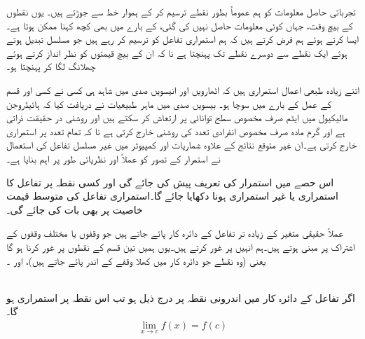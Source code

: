 تجرباتی حاصل معلومات  کو ہم عموماً بطور نقطے ترسیم کر کے  ہموار خط سے جوڑتے ہیں۔ یوں نقطوں کے بیچ وقت، جہاں کوئی معلومات حاصل نہیں کی گئی، کے بارے میں بھی کچھ کہنا ممکن ہوتا ہے۔ایسا کرتے ہوئے ہم فرض کرتے ہیں کہ ہم استمراری تفاعل کو ترسیم کر رہے ہیں جو مسلسل تبدیل ہوتے ہوئے ایک نقطے سے دوسرے نقطے تک پہنچتا ہے نا کہ ان کے بیچ قیمتوں کو نظر انداز کرتے ہوئے چھلانگ لگا کر پہنچتا ہو۔   

اتنے زیادہ طبعی اعمال  استمراری ہیں کہ اٹھارویں اور  انیسویں  صدی میں شاہد ہی کسی نے کسی اور قسم کے عمل کے بارے میں سوچا ہو۔ بیسویں صدی میں ماہر طبیعیات نے دریافت کیا کہ ہائیڈروجن  مالیکیول میں ایٹم صرف مخصوص سطح توانائی پر ارتعاش کر سکتے ہیں اور روشنی در حقیقت ذراتی ہے اور گرم مادہ صرف مخصوص انفرادی تعدد کی روشنی خارج کرتی ہے نا کہ تمام تعدد پر استمراری خارج کرتی ہے۔ان غیر متوقع نتائج کے علاوہ شماریات اور  کمپیوٹر میں غیر مسلسل  تفاعل کی استعمال نے استمرار کے تصور کو عملاً اور نظریاتی طور پر اہم بنایا ہے۔

اس حصے میں استمرار کی تعریف پیش کی جائے گی اور کسی نقطہ پر تفاعل کا استمراری یا غیر استمراری ہونا دکھایا جائے گا۔استمراری تفاعل کی متوسط قیمت خاصیت پر بھی بات کی جائے گی۔

عملاً حقیقی متغیر کے زیادہ تر تفاعل کے دائرہ کار پائے جاتے ہیں جو وقفوں یا مختلف وقفوں کے اشتراک پر مبنی ہوتے ہیں۔ہم انہیں پر غور کرتے ہیں۔یوں ہمیں تین قسم کے نقطوں پر غور کرنا ہو گا یعنی  (وہ نقطے جو دائرہ کار میں کھلا وقفے  کے اندر پائے جاتے ہیں)،  اور ۔

\\
اگر تفاعل  کے دائرہ کار میں اندرونی نقطہ  پر درج ذیل ہو تب اس نقطہ پر  استمراری ہو گا۔
\begin{align*}
\lim_{x\to c}f(x)=f(c)
\end{align*}


